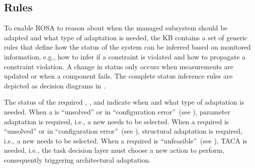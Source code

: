 \subsection{Rules}\label{sec:rosa:rules}
To enable ROSA to reason about when the managed subsystem should be adapted and what type of adaptation is needed, the KB contains a set of generic rules that define how the status of the system can be inferred based on monitored information, e.g., how to infer if a constraint is violated and how to propagate a constraint violation.
A change in status only occurs when measurements are updated or when a component fails. The complete status inference rules are depicted as decision diagrams in .

The status of the required , , and  indicate when and what type of adaptation is needed. When a  is ``unsolved'' or in ``configuration error''~(see ), parameter adaptation is required, i.e., a new  needs to be selected. When a required  is ``unsolved'' or in ``configuration error''~(see ), structural adaptation is required, i.e., a new  needs to be selected. When a required  is ``unfeasible''~(see ), TACA is needed, i.e., the task decision layer must choose a new action to perform, consequently triggering architectural adaptation.

